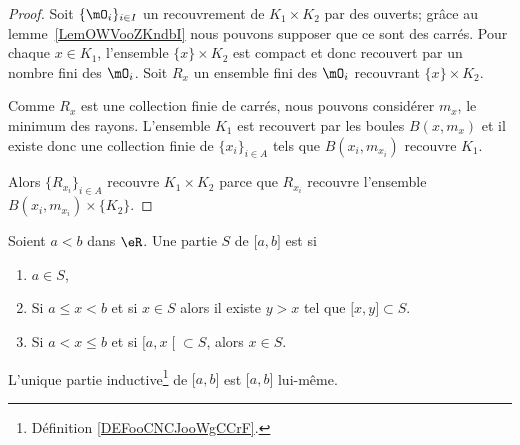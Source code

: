 \begin{proof}
	Soit \( \{ \mO_i \}_{i\in I}\) un recouvrement de \( K_1\times K_2\) par des ouverts; grâce au lemme~\ref{LemOWVooZKndbI} nous pouvons supposer que ce sont des carrés. Pour chaque \( x\in K_1\), l'ensemble \( \{ x \}\times K_2\) est compact et donc recouvert par un nombre fini des \( \mO_i\). Soit \( R_x\) un ensemble fini des \( \mO_i\) recouvrant \( \{ x \}\times K_2\).

	Comme \( R_x\) est une collection finie de carrés, nous pouvons considérer \( m_x\), le minimum des rayons. L'ensemble \( K_1\) est recouvert par les boules \( B(x,m_x)\) et il existe donc une collection finie de \( \{ x_i \}_{i\in A}\) tels que \( B(x_i,m_{x_i})\) recouvre \( K_1\).

	Alors \( \{ R_{x_i} \}_{i\in A}\) recouvre \( K_1\times K_2\) parce que \( R_{x_i}\) recouvre l'ensemble \( B(x_i,m_{x_i})\times \{ K_2 \}\).
\end{proof}

\begin{definition}  \label{DEFooCNCJooWgCCrF}
    Soient \( a<b\) dans \( \eR\). Une partie \( S\) de \( \mathopen[ a , b \mathclose]\) est  si
    \begin{enumerate}
        \item
            \( a\in S\),
        \item
            Si \( a\leq x<b\) et si \( x\in S\) alors il existe \( y>x\) tel que \( \mathopen[ x , y \mathclose]\subset S\).
        \item
            Si \( a<x\leq b\) et si \( \mathopen[ a , x \mathclose[\subset S\), alors \( x\in S\).
    \end{enumerate}
\end{definition}

\begin{proposition}       \label{PROPooQVQKooIjWBrk}
    L'unique partie inductive\footnote{Définition \ref{DEFooCNCJooWgCCrF}.} de \( \mathopen[ a , b \mathclose]\) est \( \mathopen[ a , b \mathclose]\) lui-même.
\end{proposition}

